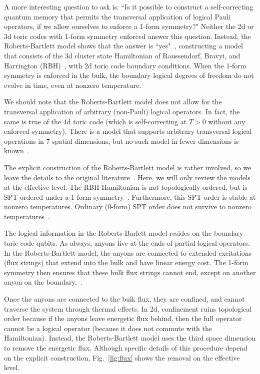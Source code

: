 A more interesting question to ask is: ``Is it possible to construct a self-correcting quantum memory that permits the transversal application of logical Pauli operators, if we allow ourselves to enforce a 1-form symmetry?" Neither the 2d or 3d toric codes with 1-form symmetry enforced answer this question. Instead, the Roberts-Bartlett model shows that the answer is ``yes"~\cite{RobertsBartlett2020}, constructing a model that consists of the 3d cluster state Hamiltonian of Raussendorf, Bravyi, and Harrington (RBH)~\cite{Raussendorf2005LongRange}, with 2d toric code boundary conditions. When the 1-form symmetry is enforced in the bulk, the boundary logical degrees of freedom do not evolve in time, even at nonzero temperature.

We should note that the Roberts-Bartlett model does not allow for the transversal application of arbitrary (non-Pauli) logical operators. In fact, the same is true of the 4d toric code (which is self-correcting at $T>0$ without any enforced symmetry). There is a model that supports arbitrary transversal logical operations in 7 spatial dimensions, but no such model in fewer dimensions is known~\cite{Bombin2013Self}.

The explicit construction of the Roberts-Bartlett model is rather involved, so we leave the details to the original literature~\cite{RobertsBartlett2020}. Here, we will only review the models at the effective level.
The RBH Hamiltonian is not topologically ordered, but is SPT-ordered under a 1-form symmetry~\cite{Roberts2017SPTO}. Furthermore, this SPT order is stable at nonzero temperatures. Ordinary (0-form) SPT order does not survive to nonzero temperatures~\cite{Roberts2017SPTO}.

The logical information in the Roberts-Barlett model resides on the boundary toric code qubits. As always, anyons live at the ends of partial logical operators.  In the Roberts-Bartlett model, the anyons are connected to extended excitations (flux strings) that extend into the bulk and have linear energy cost. The 1-form symmetry then ensures that these bulk flux strings cannot end, except on another anyon on the boundary.~\cite{RobertsBartlett2020}.

Once the anyons are connected to the bulk flux, they are confined, and cannot traverse the system through thermal effects. In 2d, confinement ruins topological order because if the anyons leave energetic flux behind, then the full operator cannot be a logical operator (because it does not commute with the Hamiltonian). Instead, the Roberts-Bartlett model uses the third space dimension to remove the energetic flux. Although specific details of this procedure depend on the explicit construction, Fig.~\ref{fig:flux} shows the removal on the effective level.

